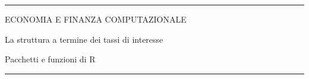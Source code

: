 \documentclass[12pt,aspectratio=169]{beamer}
\begin{document}
\begin{frame}
\unitlength 5mm

\begin{center}

\rule{\textwidth}{2pt}

\vskip3mm
ECONOMIA E FINANZA COMPUTAZIONALE

La struttura a termine dei tassi di interesse

Pacchetti e funzioni di R
\rule{\textwidth}{2pt}

\end{center}

\end{frame}


\end{document}

